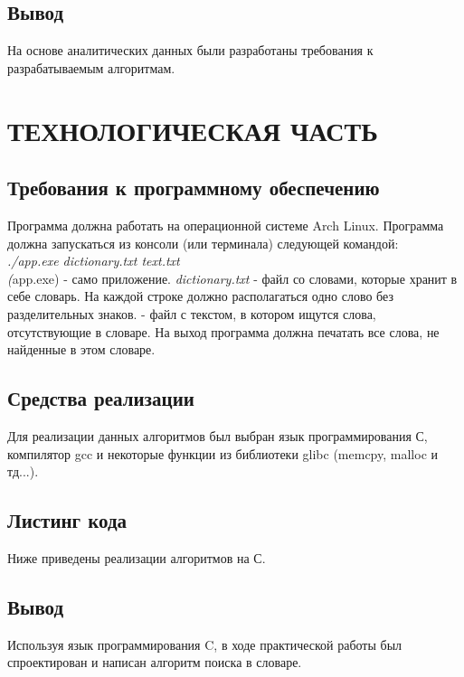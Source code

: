 \documentclass[a4paper,12pt]{article}
\begin{document}
\newpage
\subsection{Вывод}
На основе аналитических данных были разработаны требования к разрабатываемым алгоритмам.


\newpage
\section{ТЕХНОЛОГИЧЕСКАЯ ЧАСТЬ}
\subsection{Требования к программному обеспечению}

Программа должна работать на операционной системе Arch Linux. 
Программа должна запускаться из консоли (или терминала) следующей командой:\\
\textit{./app.exe dictionary.txt text.txt} \\
\textit(app.exe) - само приложение. \textit{dictionary.txt} - файл со словами, которые хранит в себе словарь. На каждой строке должно располагаться одно слово без разделительных знаков.  - файл с текстом, в котором ищутся слова, отсутствующие в словаре.
На выход программа должна печатать все слова, не найденные в этом словаре.

\newpage
\subsection{Средства реализации}
Для реализации данных алгоритмов был выбран язык программирования С, компилятор gcc и некоторые функции из библиотеки glibc (memcpy, malloc и тд...). \\

\newpage
\subsection{Листинг кода}
Ниже приведены реализации алгоритмов на С.\\

\newpage
\subsection{Вывод}
Используя язык программирования C, в ходе практической работы был спроектирован и написан алгоритм поиска в словаре.
\end{document}
